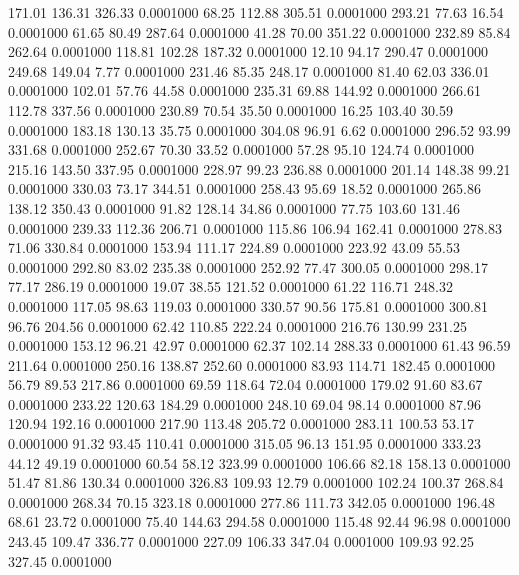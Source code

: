  171.01  136.31  326.33   0.0001000
  68.25  112.88  305.51   0.0001000
 293.21   77.63   16.54   0.0001000
  61.65   80.49  287.64   0.0001000
  41.28   70.00  351.22   0.0001000
 232.89   85.84  262.64   0.0001000
 118.81  102.28  187.32   0.0001000
  12.10   94.17  290.47   0.0001000
 249.68  149.04    7.77   0.0001000
 231.46   85.35  248.17   0.0001000
  81.40   62.03  336.01   0.0001000
 102.01   57.76   44.58   0.0001000
 235.31   69.88  144.92   0.0001000
 266.61  112.78  337.56   0.0001000
 230.89   70.54   35.50   0.0001000
  16.25  103.40   30.59   0.0001000
 183.18  130.13   35.75   0.0001000
 304.08   96.91    6.62   0.0001000
 296.52   93.99  331.68   0.0001000
 252.67   70.30   33.52   0.0001000
  57.28   95.10  124.74   0.0001000
 215.16  143.50  337.95   0.0001000
 228.97   99.23  236.88   0.0001000
 201.14  148.38   99.21   0.0001000
 330.03   73.17  344.51   0.0001000
 258.43   95.69   18.52   0.0001000
 265.86  138.12  350.43   0.0001000
  91.82  128.14   34.86   0.0001000
  77.75  103.60  131.46   0.0001000
 239.33  112.36  206.71   0.0001000
 115.86  106.94  162.41   0.0001000
 278.83   71.06  330.84   0.0001000
 153.94  111.17  224.89   0.0001000
 223.92   43.09   55.53   0.0001000
 292.80   83.02  235.38   0.0001000
 252.92   77.47  300.05   0.0001000
 298.17   77.17  286.19   0.0001000
  19.07   38.55  121.52   0.0001000
  61.22  116.71  248.32   0.0001000
 117.05   98.63  119.03   0.0001000
 330.57   90.56  175.81   0.0001000
 300.81   96.76  204.56   0.0001000
  62.42  110.85  222.24   0.0001000
 216.76  130.99  231.25   0.0001000
 153.12   96.21   42.97   0.0001000
  62.37  102.14  288.33   0.0001000
  61.43   96.59  211.64   0.0001000
 250.16  138.87  252.60   0.0001000
  83.93  114.71  182.45   0.0001000
  56.79   89.53  217.86   0.0001000
  69.59  118.64   72.04   0.0001000
 179.02   91.60   83.67   0.0001000
 233.22  120.63  184.29   0.0001000
 248.10   69.04   98.14   0.0001000
  87.96  120.94  192.16   0.0001000
 217.90  113.48  205.72   0.0001000
 283.11  100.53   53.17   0.0001000
  91.32   93.45  110.41   0.0001000
 315.05   96.13  151.95   0.0001000
 333.23   44.12   49.19   0.0001000
  60.54   58.12  323.99   0.0001000
 106.66   82.18  158.13   0.0001000
  51.47   81.86  130.34   0.0001000
 326.83  109.93   12.79   0.0001000
 102.24  100.37  268.84   0.0001000
 268.34   70.15  323.18   0.0001000
 277.86  111.73  342.05   0.0001000
 196.48   68.61   23.72   0.0001000
  75.40  144.63  294.58   0.0001000
 115.48   92.44   96.98   0.0001000
 243.45  109.47  336.77   0.0001000
 227.09  106.33  347.04   0.0001000
 109.93   92.25  327.45   0.0001000
